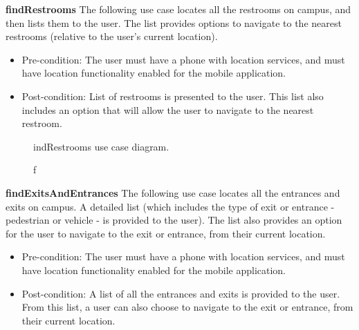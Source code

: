 \documentclass[12pt,a4paper]{article}
\begin{document}
			\textbf{findRestrooms}
			The following use case locates all the restrooms on campus, and then lists them to the user. The list provides     			options to navigate to the nearest restrooms (relative to the user's current location).
			
			\begin{itemize}
			\item Pre-condition: The user must have a phone with location services, and must have location functionality  						  enabled for the mobile application.
			\item Post-condition: List of restrooms is presented to the user. This list also includes an option that will 						  allow the user to navigate to the nearest restroom.
			\end{itemize}
			
			\begin{figure}[h!]
				\caption findRestrooms use case diagram.
			\end{figure}
			
			\textbf{findExitsAndEntrances}
			The following use case locates all the entrances and exits on campus. A detailed list (which includes the type of 				exit or entrance - pedestrian or vehicle - is provided to the user). The list also provides an option for the user 			to navigate to the exit or entrance, from their current location.
			
			\begin{itemize}
			\item Pre-condition: The user must have a phone with location services, and must have location functionality 						  enabled for the mobile application.
			\item Post-condition: A list of all the entrances and exits is provided to the user. From this list, a user can 					  also choose to navigate to the exit or entrance, from their current location.
			\end{itemize}
			
\end{document}
